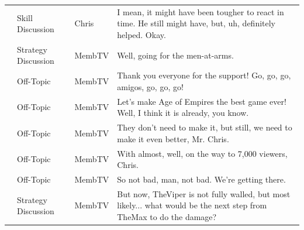 {\begin{longtable}{@{}>{\theAppRow}r|L{2.3cm}L{1.0cm}U{11.55cm}@{}}
    & Skill Discussion      & Chris        & I mean, it might have been tougher to react in time. He still might have, but, uh, definitely helped. Okay.                                                                                                                                                      \\
    & Strategy Discussion   & MembTV       & Well, going for the men-at-arms.                                                                                                                                                                                                                                 \\
    & Off-Topic & MembTV       & Thank you everyone for the support! Go, go, go, amigos, go, go, go!                                                                                                                                                                                              \\
    & Off-Topic & MembTV       & Let's make Age of Empires the best game ever! Well, I think it is already, you know.                                                                                                                                                                             \\
    & Off-Topic & MembTV       & They don't need to make it, but still, we need to make it even better, Mr. Chris.                                                                                                                                                                                \\
    & Off-Topic & MembTV       & With almost, well, on the way to 7,000 viewers, Chris.                                                                                                                                                                                                           \\
    & Off-Topic & MembTV       & So not bad, man, not bad. We're getting there.                                                                                                                                                                                                                   \\
    & Strategy Discussion   & MembTV       & But now, TheViper is not fully walled, but most likely... what would be the next step from TheMax to do the damage?                                                                                                                                              \\

\end{longtable}}
